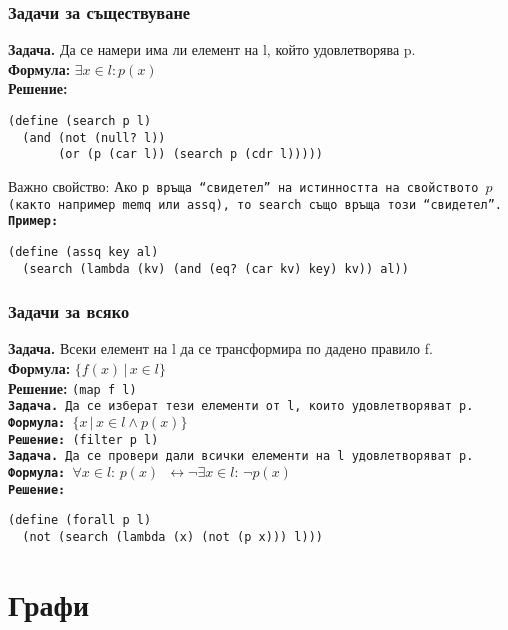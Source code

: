 \documentclass{beamer}
\begin{document}
\begin{frame}[fragile]
  \frametitle{Задачи за съществуване}

  \textbf{Задача.} Да се намери има ли елемент на l, който удовлетворява p.\\
  \pause
  \textbf{Формула:} $\exists x\in l: p(x)$\\
  \pause
  \textbf{Решение:}
\begin{verbatim}
(define (search p l)
  (and (not (null? l))
       (or (p (car l)) (search p (cdr l)))))
\end{verbatim}
  \pause
  \alert{Важно свойство:} Ако \tt p връща ``свидетел'' на истинността на свойството $p$ (както например \tt{memq} или \tt{assq}), то \tt{search} също връща този ``свидетел''.\\
  \pause
  \textbf{Пример:}
\begin{verbatim}
(define (assq key al)
  (search (lambda (kv) (and (eq? (car kv) key) kv)) al))
\end{verbatim}
  \pause
\end{frame}

\begin{frame}[fragile]
  \frametitle{Задачи за всяко}
  \textbf{Задача.} Всеки елемент на l да се трансформира по дадено правило f.\\
  \pause
  \textbf{Формула:} $\{f(x)\,|\,x \in l \}$\\
  \pause
  \textbf{Решение:} \tt{(map f l)}\\[1em]
  \pause
  \textbf{Задача.} Да се изберат тези елементи от l, които удовлетворяват p.\\
  \pause
  \textbf{Формула:} $\{x\,|\,x \in l \wedge p(x) \}$\\
  \pause
  \textbf{Решение:} \tt{(filter p l)}\\[1em]
  \pause
  \textbf{Задача.} Да се провери дали всички елементи на l удовлетворяват p.\\
  \pause
  \textbf{Формула:} $\forall x\in l:\,p(x)$ \pause $\leftrightarrow \neg \exists x\in l:\,\neg p(x)$\\
  \pause
  \textbf{Решение:}
\begin{verbatim}
(define (forall p l)
  (not (search (lambda (x) (not (p x))) l)))
\end{verbatim}
\end{frame}

\section{Графи}
\end{document}
